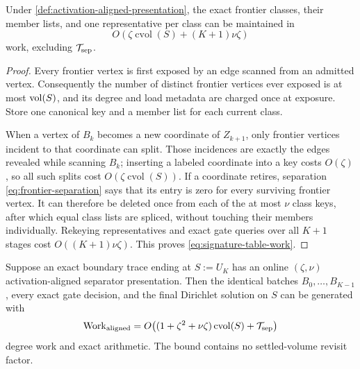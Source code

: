 \begin{lemma}
\label{lem:exact-signature-table}
Under \cref{def:activation-aligned-presentation}, the exact frontier classes,
their member lists, and one representative per class can be maintained in
\begin{equation}
 O\!\left(
   \zeta\operatorname{cvol}(S)+(K+1)\nu\zeta
 \right)
 \label{eq:signature-table-work}
\end{equation}
work, excluding $\mathcal T_{\rm sep}$.
\end{lemma}

\begin{proof}
Every frontier vertex is first exposed by an edge scanned from an admitted
vertex.  Consequently the number of distinct frontier vertices ever exposed
is at most $\operatorname{vol}(S)$, and its degree and load metadata are charged once at
exposure.  Store one canonical key and a member list for each current class.

When a vertex of $B_k$ becomes a new coordinate of $Z_{k+1}$, only frontier
vertices incident to that coordinate can split.  Those incidences are exactly
the edges revealed while scanning $B_k$; inserting a labeled coordinate into
a key costs $O(\zeta)$, so all such splits cost
$O(\zeta\operatorname{cvol}(S))$.  If a coordinate retires, separation
\cref{eq:frontier-separation} says that its entry is zero for every surviving
frontier vertex.  It can therefore be deleted once from each of the at most
$\nu$ class keys, after which equal class lists are spliced, without touching
their members individually.  Rekeying representatives and exact gate queries
over all $K+1$ stages cost $O((K+1)\nu\zeta)$.  This proves
\cref{eq:signature-table-work}.
\end{proof}

\begin{theorem}
\label{thm:aligned-separator-signature}
Suppose an exact boundary trace ending at $S:=U_K$ has an online
$(\zeta,\nu)$ activation-aligned separator presentation.  Then the identical
batches $B_0,\ldots,B_{K-1}$, every exact gate decision, and the final
Dirichlet solution on $S$ can be generated with
\begin{equation}
 \operatorname{Work}_{\rm aligned}
 =O\!\left(
  (1+\zeta^2+\nu\zeta)\operatorname{cvol}(S)
  +\mathcal T_{\rm sep}
 \right)
 \label{eq:aligned-separator-work}
\end{equation}
degree work and exact arithmetic.  The bound contains no settled-volume
revisit factor.
\end{theorem}

